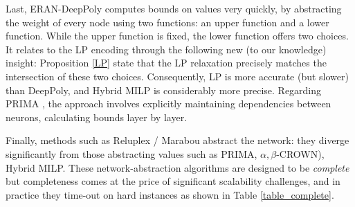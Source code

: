 Last, ERAN-DeepPoly \cite{deeppoly} computes bounds on values very quickly, by abstracting the weight of every node using two functions: an upper function and a lower function. While the upper function is fixed, the lower function offers two choices.
It relates to the LP encoding through the following new (to our knowledge) insight:  Proposition \ref{LP} state that the LP relaxation precisely matches the intersection of these two choices. Consequently, LP is more accurate (but slower) than DeepPoly, and Hybrid MILP is considerably more precise. Regarding PRIMA \cite{prima}, the approach involves explicitly maintaining dependencies between neurons, calculating bounds layer by layer.




Finally, methods such as Reluplex / Marabou \cite{Reluplex,katz2019marabou}  abstract the network: they diverge significantly from those abstracting values such as PRIMA, $\alpha,\beta$-CROWN)\cite{prima,crown}, Hybrid MILP. 
These network-abstraction algorithms are designed to be {\em complete} but completeness comes at the price of significant scalability challenges, and in practice they time-out on hard instances as shown in Table \ref{table_complete}.
